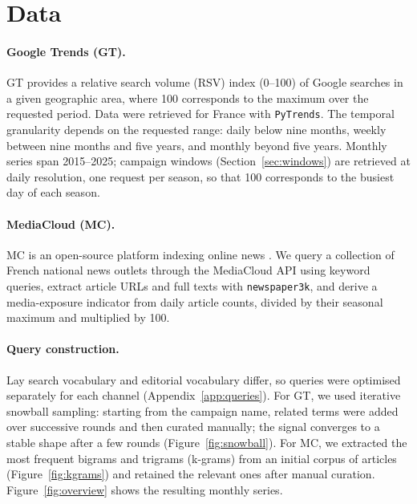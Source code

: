 \documentclass[11pt,a4paper]{article}
\begin{document}
\section{Data}\label{sec:data}
\paragraph{Google Trends (GT).} GT provides a relative search volume (RSV) index (0--100) of Google searches in a given geographic area, where 100 corresponds to the maximum over the requested period. Data were retrieved for France with \texttt{PyTrends}. The temporal granularity depends on the requested range: daily below nine months, weekly between nine months and five years, and monthly beyond five years. Monthly series span 2015--2025; campaign windows (Section~\ref{sec:windows}) are retrieved at daily resolution, one request per season, so that 100 corresponds to the busiest day of each season.

\paragraph{MediaCloud (MC).} MC is an open-source platform indexing online news \cite{roberts2021}. We query a collection of French national news outlets through the MediaCloud API using keyword queries, extract article URLs and full texts with \texttt{newspaper3k}, and derive a media-exposure indicator from daily article counts, divided by their seasonal maximum and multiplied by 100.

\paragraph{Query construction.} Lay search vocabulary and editorial vocabulary differ, so queries were optimised separately for each channel (Appendix~\ref{app:queries}). For GT, we used iterative snowball sampling: starting from the campaign name, related terms were added over successive rounds and then curated manually; the signal converges to a stable shape after a few rounds (Figure~\ref{fig:snowball}). For MC, we extracted the most frequent bigrams and trigrams (k-grams) from an initial corpus of articles (Figure~\ref{fig:kgrams}) and retained the relevant ones after manual curation. Figure~\ref{fig:overview} shows the resulting monthly series.
\end{document}
